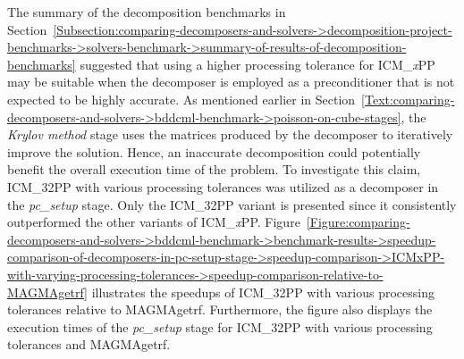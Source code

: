 The summary of the decomposition benchmarks in Section~\ref{Subsection:comparing-decomposers-and-solvers->decomposition-project-benchmarks->solvers-benchmark->summary-of-results-of-decomposition-benchmarks} suggested that using a higher processing tolerance for ICM\_\textit{x}PP may be suitable when the decomposer is employed as a preconditioner that is not expected to be highly accurate. As mentioned earlier in Section~\ref{Text:comparing-decomposers-and-solvers->bddcml-benchmark->poisson-on-cube-stages}, the \textit{Krylov method} stage uses the  matrices produced by the decomposer to iteratively improve the solution. Hence, an inaccurate decomposition could potentially benefit the overall execution time of the problem. To investigate this claim, ICM\_32PP with various processing tolerances was utilized as a decomposer in the \textit{pc\_setup} stage. Only the ICM\_32PP variant is presented since it consistently outperformed the other variants of ICM\_\textit{x}PP. Figure~\ref{Figure:comparing-decomposers-and-solvers->bddcml-benchmark->benchmark-results->speedup-comparison-of-decomposers-in-pc-setup-stage->speedup-comparison->ICMxPP-with-varying-processing-tolerances->speedup-comparison-relative-to-MAGMAgetrf} illustrates the speedups of ICM\_32PP with various processing tolerances relative to MAGMAgetrf. Furthermore, the figure also displays the execution times of the \textit{pc\_setup} stage for ICM\_32PP with various processing tolerances and MAGMAgetrf.

